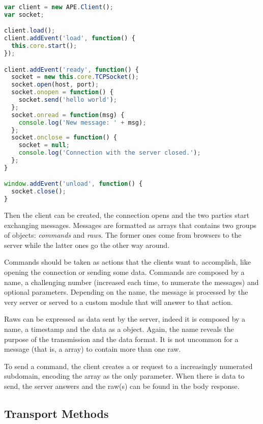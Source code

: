 \begin{lstlisting}[language=JavaScript,label=apesocket,caption=TCPSocket usage in APE JSF]
var client = new APE.Client();
var socket;

client.load();
client.addEvent('load', function() {
  this.core.start();
});

client.addEvent('ready', function() {
  socket = new this.core.TCPSocket();
  socket.open(host, port);
  socket.onopen = function() {
    socket.send('hello world');
  };
  socket.onread = function(msg) {
    console.log('New message: ' + msg);
  };
  socket.onclose = function() {
    socket = null;
    console.log('Connection with the server closed.');
  };
}

window.addEvent('unload', function() {
  socket.close();
}
\end{lstlisting}

Then the  client can be created, the connection opens and the two parties start exchanging messages.
Messages are formatted as  arrays that contains two groups of objects: \emph{commands} and \emph{raws}.
The former ones come from browsers to the server while the latter ones go the other way around.

Commands should be taken as actions that the clients want to accomplish, like opening the connection or sending some data.
Commands are composed by a name, a challenging number (increased each time, to numerate the messages) and optional parameters.
Depending on the name, the message is processed by the very  server or served to a custom module that will answer to that action.

Raws can be expressed as data sent by the server, indeed it is composed by a name, a timestamp and the data as a  object.
Again, the name reveals the purpose of the transmission and the data format.
It is not uncommon for a message (that is, a  array) to contain more than one raw.

To send a command, the client creates a  or  request to a increasingly numerated subdomain, encoding the  array as the only parameter.
When there is data to send, the server answers and the raw(s) can be found in the body response.


\subsection{Transport Methods} %
\label{sub:transport_methods}

